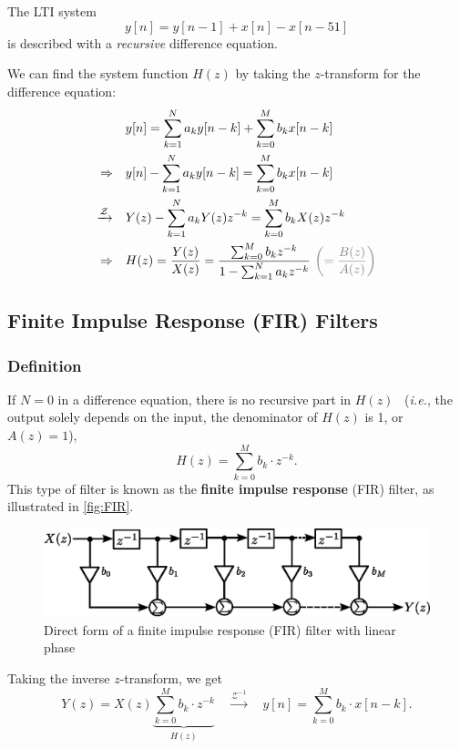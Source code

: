 \begin{ex}{}
    The LTI system
    \[
        y[n] = y[n-1] + x[n] - x[n-51]
    \]
    is described with a \textit{recursive} difference equation.
\end{ex}

We can find the system function $H(z)$ by taking the $z$-transform for the difference equation:
\begin{align*}
    & y[n] = \sum_{k=1}^{N} a_{k}y[n-k] + \sum_{k=0}^{M} b_{k}x[n-k] \\
    \Rightarrow \quad & y[n] - \sum_{k=1}^{N} a_{k}y[n-k] =  \sum_{k=0}^{M} b_{k}x[n-k] \\
    \xrightarrow[]{\mathcal{Z}} \quad & Y(z) - \sum_{k=1}^{N} a_{k} Y(z) z^{-k} = \sum_{k=0}^{M} b_{k} X(z) z^{-k}\\
    \Rightarrow \quad & H(z) = \frac{Y(z)}{X(z)} = \frac{\sum_{k=0}^{M} b_{k} z^{-k}}{1-\sum_{k=1}^{N} a_{k} z^{-k}} \ {\color{gray} \left( = \frac{B(z)}{A(z)} \right) }
\end{align*}


\subsection{Finite Impulse Response (FIR) Filters}
\subsubsection{Definition}
If $N=0$ in a difference equation, there is no recursive part in $H(z)$ \ (\textit{i.e.}, the output solely depends on the input, the denominator of $H(z)$ is 1, {\color{gray}or $A(z)=1$}),
\[
    H(z) = \sum_{k=0}^{M} b_k \cdot z^{-k}.
\]
This type of filter is known as the \textbf{finite impulse response} (FIR) filter, as illustrated in \autoref{fig:FIR}. \\

\begin{figure}[H]
    \centering
    \includegraphics[width=.8\textwidth]{images/FIR_filter.eps}
    \caption{Direct form of a finite impulse response (FIR) filter with linear phase}
    \label{fig:FIR}
\end{figure}


Taking the inverse $z$-transform, we get
\[
    Y(z) = X(z) \underbrace{\sum_{k=0}^{M} b_k \cdot z^{-k}}_{H(z)} \quad \xrightarrow{\mathcal{Z}^{-1}} \quad
    y[n] = \sum_{k=0}^{M} b_k \cdot x[n-k].
\]

